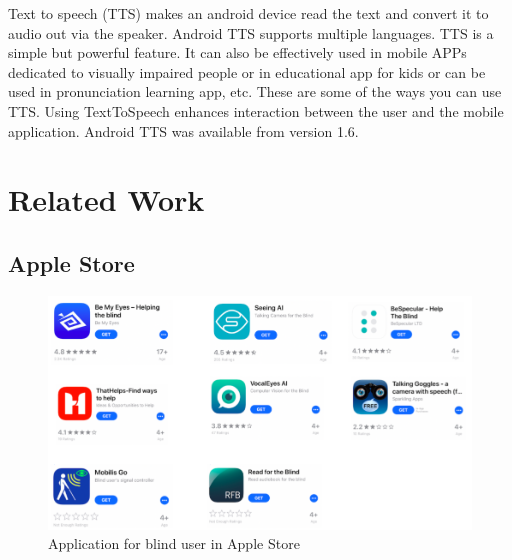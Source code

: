 \documentclass[11pt]{ucscthesis}
\begin{document}
Text to speech (TTS)\cite{TTSandroid} makes an android device read the text and convert it to audio out via the speaker. Android TTS supports multiple languages. TTS is a simple but powerful feature. It can also be effectively used in mobile APPs dedicated to visually impaired people or in educational app for kids or can be used in pronunciation learning app, etc. These are some of the ways you can use TTS. Using TextToSpeech enhances interaction between the user and the mobile application. Android TTS was available from version 1.6.





\chapter{Related Work}
\section{Apple Store}
\begin{figure}
    \centering
    \includegraphics[width =0.8\linewidth]{Fig/AppleBlind.png}
    \caption{Application for blind user in Apple Store}
    \label{Application for blind user in Google Play Store}
\end{figure}
\end{document}
